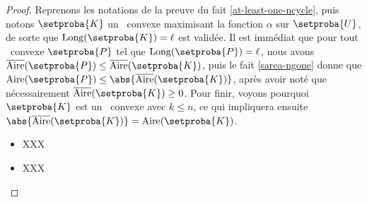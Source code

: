 \begin{proof}
    Reprenons les notations de la preuve du fait \ref{at-least-one-ncycle}, puis notons $\setproba{K}$ un \ncycle\ convexe maximisant la fonction $\alpha$ sur $\setproba{U}$, de sorte que $\cyclelen{\setproba{K}} = \ell$ est validée.
    Il est immédiat que pour tout \ngone\ convexe $\setproba{P}$ tel que $\cyclelen{\setproba{P}} = \ell$, nous avons $\sarea{\setproba{P}} \leq \sarea{\setproba{K}}$, puis le fait \ref{sarea-ngone} donne que $\area{\setproba{P}} \leq \abs{\sarea{\setproba{K}}}$, après avoir noté que nécessairement $\sarea{\setproba{K}} \geq 0$.
    Pour finir, voyons pourquoi $\setproba{K}$ est un \kgone\ convexe avec $k \leq n$, ce qui impliquera ensuite $\abs{\sarea{\setproba{K}}} = \area{\setproba{K}}$.
	\begin{itemize}
		\item XXX

		\item XXX
    \end{itemize}
	
	\null\vspace{-6ex}
\end{proof}
